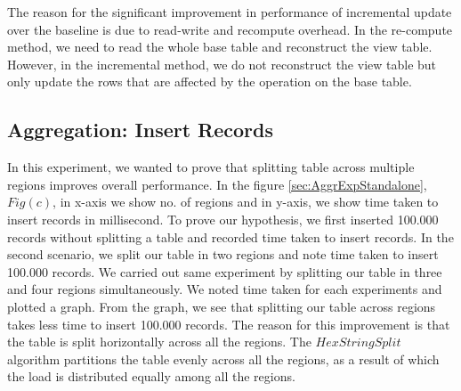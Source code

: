 \documentclass[11pt,a4paper,bibtotoc,idxtotoc,headsepline,footsepline,footexclude,BCOR12mm,DIV13]{scrbook}
\begin{document}
The reason for the significant improvement in performance of incremental update over the baseline is due to read-write and recompute overhead.
In the re-compute method, we need to read the whole base table and
reconstruct the view table. However, in the incremental method, we do not reconstruct the view table but only update the rows that are affected by the operation on the base table. 

\subsection{Aggregation: Insert Records}
\label{Insert Records Aggr}

In this experiment, we wanted to prove that splitting table across multiple regions improves overall performance. In the figure \ref{sec:AggrExpStandalone}, $Fig(c)$, in x-axis we show no. of regions and in y-axis, we show time taken to insert records in millisecond. To prove our hypothesis, we first inserted 100.000 records without splitting a table and recorded time taken to insert records. In the second scenario, we split our table in two regions and note time taken to insert 100.000 records. We carried out same experiment by splitting our table in three and four regions simultaneously. We noted time taken for each experiments and plotted a graph. From the graph, we see that splitting our table across regions takes less time to insert 100.000 records. The reason for this improvement is that the table is split horizontally across all the regions. The $HexStringSplit$ algorithm partitions the table evenly across all the regions, as a result of which the load is distributed equally among all the regions.


\end{document}

